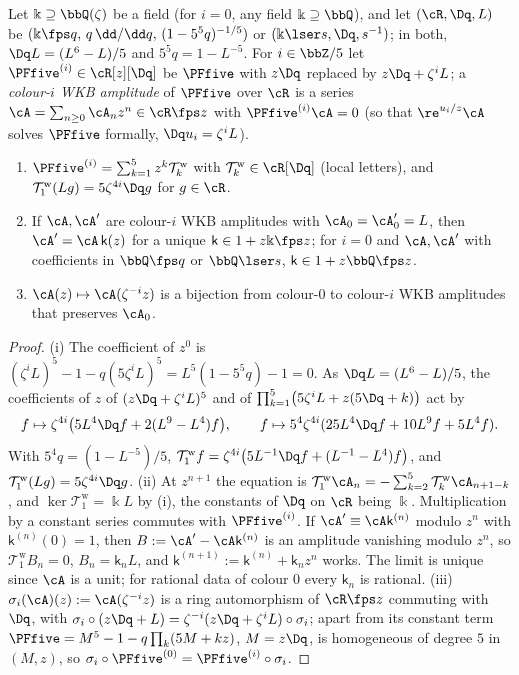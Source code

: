 \begin{lem}
\label{lem:gau-wkb}
Let $\Bbbk\supseteq\bbQ(\zeta)$ be a field (for $i=0$, any field $\Bbbk\supseteq\bbQ$), and let $(\cR,\Dq,L)$ be $(\Bbbk\fps q,\,q\,\dd/\dd q,\,(1-5^5q)^{-1/5})$ or $(\Bbbk\lser s,\Dq,s^{-1})$; in both, $\Dq L=(L^6-L)/5$ and $5^5q=1-L^{-5}$. For $i\in\bbZ/5$ let $\PFfive^{(i)}\in\cR[z][\Dq]$ be $\PFfive$ with $z\Dq$ replaced by $z\Dq+\zeta^iL$; a \emph{colour-$i$ WKB amplitude} of $\PFfive$ over $\cR$ is a series $\cA=\sum_{n\geq0}\cA_nz^n\in\cR\fps z$ with $\PFfive^{(i)}\cA=0$ (so that $\re^{u_i/z}\cA$ solves $\PFfive$ formally, $\Dq u_i=\zeta^iL$).
\begin{enumerate}
\item $\PFfive^{(i)}=\sum_{k=1}^5z^k\mathcal T^{\mathrm w}_k$ with $\mathcal T^{\mathrm w}_k\in\cR[\Dq]$ (local letters), and $\mathcal T^{\mathrm w}_1(Lg)=5\zeta^{4i}\Dq g$ for $g\in\cR$.
\item If $\cA,\cA'$ are colour-$i$ WKB amplitudes with $\cA_0=\cA'_0=L$, then $\cA'=\cA\,\mathsf k(z)$ for a unique $\mathsf k\in1+z\Bbbk\fps z$; for $i=0$ and $\cA,\cA'$ with coefficients in $\bbQ\fps q$ or $\bbQ\lser s$, $\mathsf k\in1+z\bbQ\fps z$.
\item $\cA(z)\mapsto\cA(\zeta^{-i}z)$ is a bijection from colour-$0$ to colour-$i$ WKB amplitudes that preserves $\cA_0$.
\end{enumerate}
\end{lem}

\begin{proof}
(i) The coefficient of $z^0$ is $(\zeta^iL)^5-1-q(5\zeta^iL)^5=L^5(1-5^5q)-1=0$. As $\Dq L=(L^6-L)/5$, the coefficients of $z$ of $(z\Dq+\zeta^iL)^5$ and of $\prod_{k=1}^5\bigl(5\zeta^iL+z(5\Dq+k)\bigr)$ act by
\[
f\mapsto\zeta^{4i}\bigl(5L^4\Dq f+2(L^9-L^4)f\bigr),\qquad f\mapsto5^4\zeta^{4i}(25L^4\Dq f+10L^9f+5L^4f).
\]
With $5^4q=(1-L^{-5})/5$, $\mathcal T^{\mathrm w}_1f=\zeta^{4i}\bigl(5L^{-1}\Dq f+(L^{-1}-L^4)f\bigr)$, and $\mathcal T^{\mathrm w}_1(Lg)=5\zeta^{4i}\Dq g$.
(ii) At $z^{n+1}$ the equation is $\mathcal T^{\mathrm w}_1\cA_n=-\sum_{k=2}^5\mathcal T^{\mathrm w}_k\cA_{n+1-k}$, and $\ker\mathcal T^{\mathrm w}_1=\Bbbk L$ by (i), the constants of $\Dq$ on $\cR$ being $\Bbbk$. Multiplication by a constant series commutes with $\PFfive^{(i)}$. If $\cA'\equiv\cA\mathsf k^{(n)}$ modulo $z^n$ with $\mathsf k^{(n)}(0)=1$, then $B:=\cA'-\cA\mathsf k^{(n)}$ is an amplitude vanishing modulo $z^n$, so $\mathcal T^{\mathrm w}_1B_n=0$, $B_n=\mathsf k_nL$, and $\mathsf k^{(n+1)}:=\mathsf k^{(n)}+\mathsf k_nz^n$ works. The limit is unique since $\cA$ is a unit; for rational data of colour $0$ every $\mathsf k_n$ is rational.
(iii) $\sigma_i(\cA)(z):=\cA(\zeta^{-i}z)$ is a ring automorphism of $\cR\fps z$ commuting with $\Dq$, with $\sigma_i\circ(z\Dq+L)=\zeta^{-i}(z\Dq+\zeta^iL)\circ\sigma_i$; apart from its constant term $\PFfive=M^5-1-q\prod_k(5M+kz)$, $M=z\Dq$, is homogeneous of degree $5$ in $(M,z)$, so $\sigma_i\circ\PFfive^{(0)}=\PFfive^{(i)}\circ\sigma_i$.
\end{proof}

